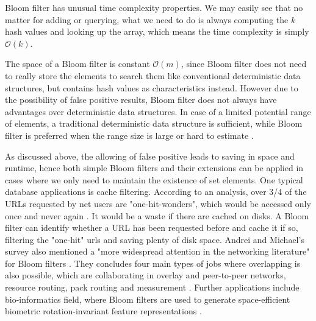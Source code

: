 \documentclass[catalog.tex]{subfiles}
\begin{document}
Bloom filter has unusual time complexity properties. We may easily see that no matter for adding or querying, what we need to do is always computing the $k$ hash values and looking up the array, which means the time complexity is simply $\mathcal{O}(k)$. 

The space of a Bloom filter is constant $\mathcal{O}(m)$, since Bloom filter does not need to really store the elements to search them like conventional deterministic data structures, but contains hash values as characteristics instead. However due to the possibility of false positive results, Bloom filter does not always have advantages over deterministic data structures. In case of a limited potential range of elements, a traditional deterministic data structure is sufficient, while Bloom filter is preferred when the range size is large or hard to estimate \cite{llimllib}.

As discussed above, the allowing of false positive leads to saving in space and runtime, hence both simple Bloom filters and their extensions can be applied in cases where we only need to maintain the existence of set elements. One typical database applications is cache filtering. According to an analysis, over 3/4 of the URLs requested by net users are "one-hit-wonders", which would be accessed only once and never again \cite{maggs2015algorithmic}. It would be a waste if there are cached on disks. A Bloom filter can identify whether a URL has been requested before and cache it if so, filtering the "one-hit" urls and saving plenty of disk space. Andrei and Michael's survey also mentioned a "more widespread attention in the networking literature" for Bloom filters \cite{broder2004network}. They concludes four main types of jobs where overlapping is also possible, which are collaborating in overlay and peer-to-peer networks, resource routing, pack routing and measurement \cite{broder2004network}. Further applications include bio-informatics field, where Bloom filters are used to generate space-efficient biometric rotation-invariant feature representations \cite{rathgeb2014application}.


\end{document}
